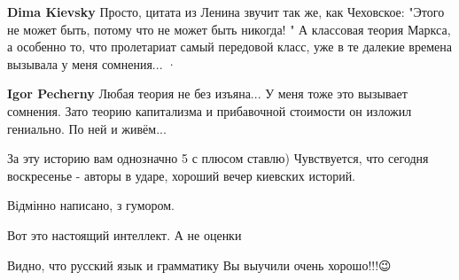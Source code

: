 \begin{itemize}
\begin{itemize}
\begin{itemize}
\textbf{Dima Kievsky} Просто, цитата из Ленина звучит так же, как Чеховское:
"Этого не может быть, потому что не может быть никогда! " А классовая теория
Маркса, а особенно то, что пролетариат самый передовой класс, уже в те далекие
времена вызывала у меня сомнения...  · 


 
\textbf{Igor Pecherny} Любая теория не без изъяна... У меня тоже это вызывает
сомнения. Зато теорию капитализма и прибавочной стоимости он изложил гениально.
По ней и живём...
\end{itemize}

\end{itemize}

 
За эту историю вам однозначно 5 с плюсом ставлю)
Чувствуется, что сегодня воскресенье - авторы в ударе, хороший вечер киевских историй.


 
Відмінно написано, з гумором.


 
Вот это настоящий интеллект. А не оценки


 
Видно, что русский язык и грамматику Вы выучили очень хорошо!!!😉


\end{itemize}
